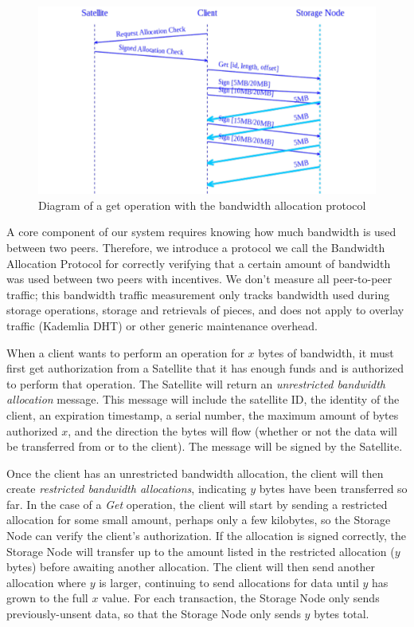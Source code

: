 \documentclass[8pt,fleqn,openany]{book}
\begin{document}
\begin{figure}
\centering
\includegraphics[width=\textwidth]{diagram-drafts/bandwidth-allocation/bandwidth-get.pdf}
\caption{Diagram of a get operation with the bandwidth allocation protocol}
\label{fig:bap-get}
\end{figure}

A core component of our system requires knowing how much bandwidth is used
between two peers. Therefore, we introduce a protocol we call the Bandwidth Allocation
Protocol for correctly verifying that a certain amount of bandwidth was used
between two peers with incentives.
We don't measure all peer-to-peer traffic;
this bandwidth traffic measurement only tracks
bandwidth used during storage operations, storage and retrievals of pieces,
and does not apply to overlay traffic (Kademlia DHT) or other generic
maintenance overhead.

When a client wants to perform an operation for $x$ bytes of bandwidth, it must
first get authorization from a Satellite
that it has enough funds and is authorized to perform that operation.
The Satellite will return an {\em unrestricted
bandwidth allocation} message. This message will include the satellite ID,
the identity of the client, an expiration timestamp, a serial number,
the maximum amount of bytes authorized $x$, and the direction the bytes will flow
(whether or not the data will be transferred from or to the client).
The message will be signed by the Satellite.


Once the client has an unrestricted bandwidth allocation, the client will then
create {\em restricted bandwidth allocations},
indicating $y$ bytes have been transferred so far. In the case of a {\em Get}
operation, the client
will start by sending a restricted allocation for some small amount,
perhaps only a few kilobytes,
so the Storage Node can verify the client's authorization.
If the allocation is signed correctly, the Storage Node will
transfer up to the amount listed in the restricted allocation ($y$ bytes) before
awaiting another allocation. The client will then send another allocation where
$y$ is larger, continuing to send allocations for data until $y$ has grown to
the full $x$ value.
For each transaction, the Storage Node only sends previously-unsent data,
so that the Storage Node only sends $y$ bytes total.
\end{document}
